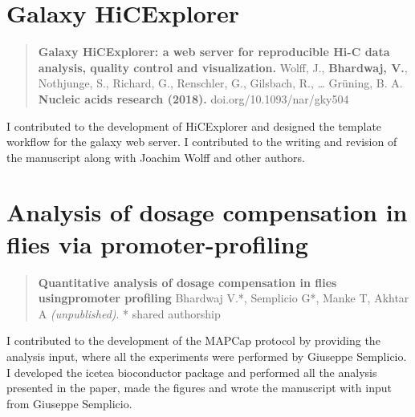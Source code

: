 \documentclass[11pt,twoside]{MPIthesis}
\theoremstyle{definition}
\theoremstyle{definition}
\theoremstyle{definition}
\theoremstyle{remark}
\begin{document}




\section{Galaxy HiCExplorer}\label{galaxy-hicexplorer}
\begin{quote}
\textbf{Galaxy HiCExplorer: a web server for reproducible Hi-C data
analysis, quality control and visualization.} Wolff, J.,
\textbf{Bhardwaj, V.}, Nothjunge, S., Richard, G., Renschler, G.,
Gilsbach, R., \ldots{} Grüning, B. A. \textbf{Nucleic acids research
(2018).} doi.org/10.1093/nar/gky504
\end{quote}
I contributed to the development of HiCExplorer and designed the
template workflow for the galaxy web server. I contributed to the
writing and revision of the manuscript along with Joachim Wolff and
other authors.



\section{Analysis of dosage compensation in flies via
promoter-profiling}\label{analysis-of-dosage-compensation-in-flies-via-promoter-profiling}
\begin{quote}
\textbf{Quantitative analysis of dosage compensation in flies
usingpromoter profiling} Bhardwaj V.*, Semplicio G*, Manke T, Akhtar A
\emph{(unpublished)}. * shared authorship
\end{quote}
I contributed to the development of the MAPCap protocol by providing the
analysis input, where all the experiments were performed by Giuseppe
Semplicio. I developed the icetea bioconductor package and performed all
the analysis presented in the paper, made the figures and wrote the
manuscript with input from Giuseppe Semplicio.


\end{document}
